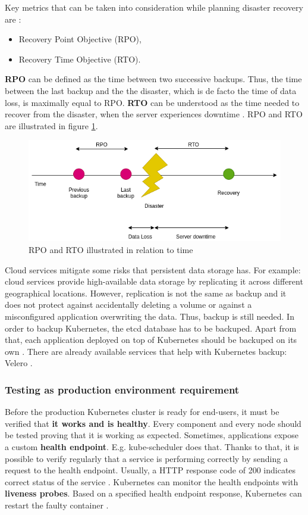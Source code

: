 Key metrics that can be taken into consideration while planning disaster recovery are \cite{article-dr,article-dr-cloud}:
\begin{itemize}
\item Recovery Point Objective (RPO),
\item Recovery Time Objective (RTO).
\end{itemize}
\textbf{RPO} can be defined as the time between two successive backups. Thus, the time between the last backup and the the disaster, which is de facto the time of data loss, is maximally equal to RPO. \textbf{RTO} can be understood as the time needed to recover from the disaster, when the server experiences downtime \cite{article-dr-cloud}. RPO and RTO are illustrated in figure \ref{fig:rpo-rto}.
\begin{figure}[H]
    \centering
    \includegraphics[width=13cm]{figures/rpo-rto.png}
    \caption{RPO and RTO illustrated in relation to time}
    \label{fig:rpo-rto}
\end{figure}

Cloud services mitigate some risks that persistent data storage has. For example: cloud services provide high-available data storage by replicating it across different geographical locations. However, replication is not the same as backup and it does not protect against accidentally deleting a volume or against a misconfigured application overwriting the data. Thus, backup is still needed. In order to backup Kubernetes, the etcd database has to be backuped. Apart from that, each application deployed on top of Kubernetes should be backuped on its own \cite{book-cndwk}. There are already available services that help with Kubernetes backup: Velero \cite{book-cndwk}.

\subsubsection{Testing as production environment requirement}
Before the production Kubernetes cluster is ready for end-users, it must be verified that \textbf{it works and is healthy}. Every component and every node should be tested proving that it is working as expected. Sometimes, applications expose a custom \textbf{health endpoint}\cite{book-devops-k8s}. E.g. kube-scheduler does that. Thanks to that, it is possible to verify regularly that a service is performing correctly by sending a request to the health endpoint. Usually, a HTTP response code of 200 indicates correct status of the service \cite{online-ms-health}. Kubernetes can monitor the health endpoints with \textbf{liveness probes}. Based on a specified health endpoint response, Kubernetes can restart the faulty container \cite{online-k8s-probes}.

